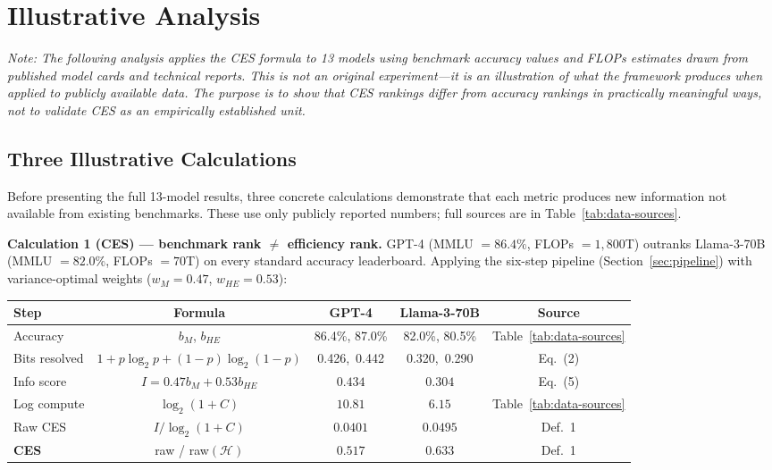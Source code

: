 \documentclass[12pt]{article}
\begin{document}
\section{Illustrative Analysis}
\label{sec:results}

\noindent\textit{Note: The following analysis applies the CES formula to 13 models using
benchmark accuracy values and FLOPs estimates drawn from published model cards and
technical reports. This is not an original experiment---it is an illustration of what the
framework produces when applied to publicly available data. The purpose is to show that
CES rankings differ from accuracy rankings in practically meaningful ways, not to validate
CES as an empirically established unit.}

\bigskip

\subsection{Three Illustrative Calculations}
\label{sec:illustrative}

Before presenting the full 13-model results, three concrete calculations demonstrate that each metric produces new information not available from existing benchmarks. These use only publicly reported numbers; full sources are in Table~\ref{tab:data-sources}.

\medskip
\noindent\textbf{Calculation 1 (CES) --- benchmark rank $\neq$ efficiency rank.}
GPT-4 (MMLU $= 86.4\%$, FLOPs $= 1{,}800$T) outranks Llama-3-70B (MMLU $= 82.0\%$, FLOPs $= 70$T) on every standard accuracy leaderboard. Applying the six-step pipeline (Section~\ref{sec:pipeline}) with variance-optimal weights ($w_M=0.47$, $w_{HE}=0.53$):

\begin{center}
\small
\begin{tabular}{lcccc}
\toprule
\textbf{Step} & \textbf{Formula} & \textbf{GPT-4} & \textbf{Llama-3-70B} & \textbf{Source}\\
\midrule
Accuracy      & $b_M$, $b_{HE}$    & 86.4\%, 87.0\%       & 82.0\%, 80.5\% & Table~\ref{tab:data-sources} \\
Bits resolved & $1+p\log_2 p+(1-p)\log_2(1-p)$ & 0.426,\ 0.442 & 0.320,\ 0.290 & Eq.~(2) \\
Info score    & $I = 0.47b_M + 0.53b_{HE}$ & $0.434$       & $0.304$        & Eq.~(5) \\
Log compute   & $\log_2(1+C)$      & $10.81$              & $6.15$         & Table~\ref{tab:data-sources} \\
Raw CES       & $I/\log_2(1+C)$    & $0.0401$             & $0.0495$       & Def.~1 \\
\textbf{CES}  & raw / raw$({\mathcal{H}})$ & $\mathbf{0.517}$ & $\mathbf{0.633}$ & Def.~1 \\
\bottomrule
\end{tabular}
\end{center}
\end{document}
